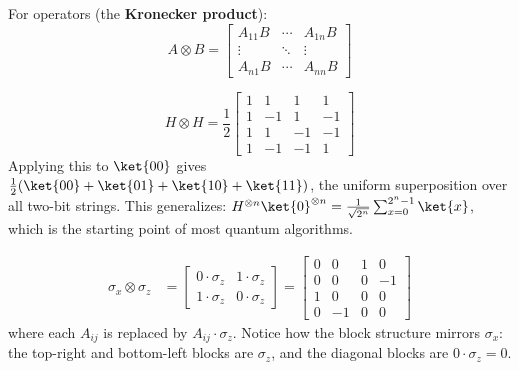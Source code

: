 \documentclass[oneside]{academica}
\begin{document}
For operators (the \textbf{Kronecker product}):
\begin{equation*}
  A\otimes B = \begin{bmatrix}A_{11}B&\cdots&A_{1n}B\\\vdots&\ddots&\vdots\\A_{n1}B&\cdots&A_{nn}B\end{bmatrix}
\end{equation*}

\begin{example*}
  \begin{equation*}
    H\otimes H =
    \frac{1}{2}\begin{bmatrix}1&1&1&1\\1&-1&1&-1\\1&1&-1&-1\\1&-1&-1&1\end{bmatrix}
  \end{equation*}
  Applying this to $\ket{00}$ gives
  $\frac{1}{2}(\ket{00}+\ket{01}+\ket{10}+\ket{11})$,
  the uniform superposition over all two-bit strings.
  This generalizes: $H^{\otimes n}\ket{0}^{\otimes n}=
  \frac{1}{\sqrt{2^n}}\sum_{x=0}^{2^n-1}\ket{x}$, which is the
  starting point of most quantum algorithms.
\end{example*}

\begin{example*}
  \begin{align*}
    \sigma_x\otimes\sigma_z
    &= \begin{bmatrix}0\cdot\sigma_z & 1\cdot\sigma_z\\1\cdot\sigma_z & 0\cdot\sigma_z\end{bmatrix}
    = \begin{bmatrix}
        0 & 0 & 1 & 0\\
        0 & 0 & 0 & -1\\
        1 & 0 & 0 & 0\\
        0 & -1 & 0 & 0
      \end{bmatrix}
  \end{align*}
  where each $A_{ij}$ is replaced by $A_{ij}\cdot\sigma_z$.
  Notice how the block structure mirrors $\sigma_x$: the top-right and bottom-left blocks are $\sigma_z$, and the diagonal blocks are $0\cdot\sigma_z=0$.
\end{example*}
\end{document}
